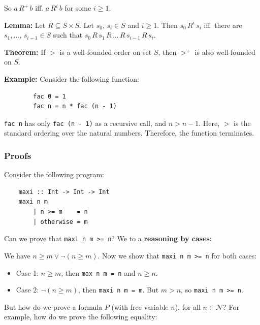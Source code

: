 \documentclass[a4paper]{extarticle}
\begin{document}
So \(a \, R^+ \, b\) iff. \(a \, R^i \, b\) for some \(i \geq 1\).

\begin{cbox}
    \textbf{Lemma:} Let \(R \subseteq S \times S\). Let \(s_0, \, s_i \in S\) and \(i \geq 1\). Then \(s_0 \, R^i \, s_i\) iff. there are \(s_1,..., \, s_{i-1} \in S\) such that \(s_0 \, R \, s_1 \, R \, ... \, R \, s_{i - 1} \, R \, s_i\).
\end{cbox}

\begin{tbox}
    \textbf{Theorem:} If \(>\) is a well-founded order on set \(S\), then \(>^+\) is also well-founded on \(S\).
\end{tbox}

\begin{ebox}
    \textbf{Example:} Consider the following function:

    \begin{verbatim}
        fac 0 = 1
        fac n = n * fac (n - 1)
    \end{verbatim}

    \verb|fac n| has only \verb|fac (n - 1)| as a recursive call, and \(n > n -1\). Here, \(>\) is the standard ordering over the natural numbers. Therefore, the function terminates.
\end{ebox}

\subsubsection{Proofs}

Consider the following program:

\begin{verbatim}
    maxi :: Int -> Int -> Int
    maxi n m
        | n >= m    = n
        | otherwise = m
\end{verbatim}

Can we prove that \verb|maxi n m >= n|? We to a \textbf{reasoning by cases:}

We have \(n \geq m \lor \lnot (n \geq m)\). Now we show that \verb|maxi n m >= n| for both cases:

\begin{itemize}
    \item Case 1: \(n \geq m\), then \verb|max n m = n| and \(n \geq n\).
    \item Case 2: \(\lnot (n \geq m)\), then \verb|maxi n m = m|. But \(m > n\), so \verb|maxi n m >= n|.
\end{itemize}

But how do we prove a formula \(P\) (with free variable \(n\)), for all \(n \in \mathcal{N}\)? For example, how do we prove the following equality:
\end{document}
